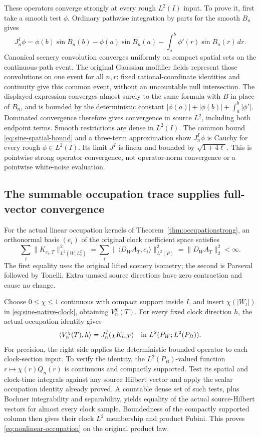 \documentclass[11pt]{article}
\begin{document}
These operators converge strongly at every rough $L^2(I)$ input.
To prove it, first take a smooth test $\phi$. Ordinary pathwise
integration by parts for the smooth $B_n$ gives
\[
 J_n^I\phi=\phi(b)\sin B_n(b)-\phi(a)\sin B_n(a)
             -\int_a^b\phi'(r)\sin B_n(r)\,dr.
\]
Canonical scenery convolution converges uniformly on compact spatial
sets on the continuous-path event. The original Gaussian
mollifier fields represent those convolutions on one event for all
$n,r$: fixed rational-coordinate identities and continuity give
this common event, without an uncountable null intersection.
The displayed expression converges almost surely to the same formula
with $B$ in place of $B_n$, and is bounded by the deterministic
constant $|\phi(a)|+|\phi(b)|+\int_a^b|\phi'|$. Dominated convergence
therefore gives convergence in source $L^2$, including both endpoint
terms. Smooth restrictions are dense in $L^2(I)$. The common bound
\eqref{eq:sine-spatial-bound} and a three-term approximation show
$J_n^I\phi$ is Cauchy for every rough $\phi\in L^2(I)$.
Its limit $J^I$ is linear and bounded by $\sqrt{1+4\ell}$.
This is pointwise strong operator convergence, not operator-norm
convergence or a pointwise white-noise evaluation.

\subsection{The summable occupation trace supplies full-vector convergence}
For the actual linear occupation kernels of
Theorem~\ref{thm:occupationstrong}, an orthonormal basis $(e_i)$
of the original clock coefficient space satisfies
\begin{equation}\label{eq:occupation-trace}
 \sum_i\|K_{e_i,T}\|_{L^2(W;L^2_x)}^2
 =\sum_i\|\langle D_WA_T,e_i\rangle\|_{L^2(P)}^2
 =\|D_WA_T\|_2^2<\infty.
\end{equation}
The first equality uses the original lifted scenery isometry; the
second is Parseval followed by Tonelli. Extra unused source directions
have zero contraction and cause no change.

Choose $0\leq\chi\leq1$ continuous with compact support inside $I$,
and insert $\chi(|W_t|)$ in \eqref{eq:sine-native-clock}, obtaining
$V_n^\chi(T)$. For every fixed clock direction $h$, the actual
occupation identity gives
\begin{equation}\label{eq:nonlinear-occupation}
 \langle V_n^\chi(T),h\rangle
   =J_n^I(\chi K_{h,T})
 \quad\hbox{in }L^2(P_W;L^2(P_B)).
\end{equation}
For precision, the right side applies the deterministic bounded
operator to each clock-section input. To verify the identity, the
$L^2(P_B)$-valued function $r\mapsto\chi(r)Q_n(r)$ is continuous
and compactly supported. Test its spatial and clock-time integrals
against any source Hilbert vector and apply the scalar occupation
identity already proved. A countable dense set of such tests, plus
Bochner integrability and separability, yields equality of the actual
source-Hilbert vectors for almost every clock sample. Boundedness
of the compactly supported column then gives their clock $L^2$
membership and product Fubini. This proves
\eqref{eq:nonlinear-occupation} on the original product law.
\end{document}
